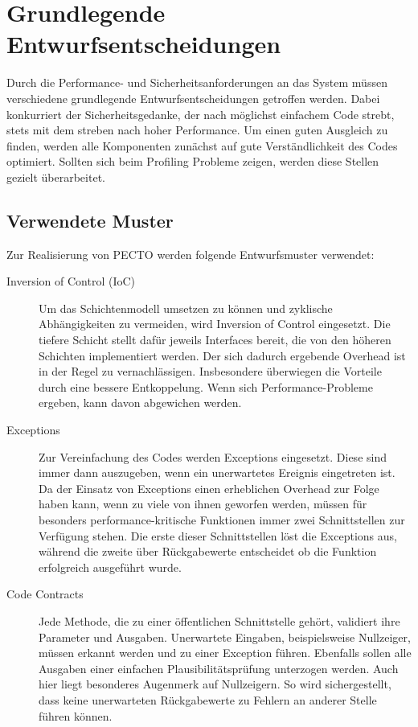 \documentclass[a4paper, 11pt, ngerman, fleqn]{article}
\begin{document}
\clearpage
\section{Grundlegende Entwurfsentscheidungen}

Durch die Performance- und Sicherheitsanforderungen an das System müssen verschiedene grundlegende Entwurfsentscheidungen getroffen werden.
Dabei konkurriert der Sicherheitsgedanke, der nach möglichst einfachem Code strebt, stets mit dem streben nach hoher Performance.
Um einen guten Ausgleich zu finden, werden alle Komponenten zunächst auf gute Verständlichkeit des Codes optimiert.
Sollten sich beim Profiling Probleme zeigen, werden diese Stellen gezielt überarbeitet.

\subsection{Verwendete Muster}
Zur Realisierung von PECTO werden folgende Entwurfsmuster verwendet:

\begin{description}
	\item[Inversion of Control (IoC)] 
	Um das Schichtenmodell umsetzen zu können und zyklische Abhängigkeiten zu vermeiden, wird Inversion of Control eingesetzt. 
	Die tiefere Schicht stellt dafür jeweils Interfaces bereit, die von den höheren Schichten implementiert werden. 
	Der sich dadurch ergebende Overhead ist in der Regel zu vernachlässigen.
	Insbesondere überwiegen die Vorteile durch eine bessere Entkoppelung.
	Wenn sich Performance-Probleme ergeben, kann davon abgewichen werden.
	
	\item[Exceptions]
	Zur Vereinfachung des Codes werden Exceptions eingesetzt.
	Diese sind immer dann auszugeben, wenn ein unerwartetes Ereignis eingetreten ist.
	Da der Einsatz von Exceptions einen erheblichen Overhead zur Folge haben kann, wenn zu viele von ihnen geworfen werden, müssen für besonders performance-kritische Funktionen immer zwei Schnittstellen zur Verfügung stehen.
	Die erste dieser Schnittstellen löst die Exceptions aus, während die zweite über Rückgabewerte entscheidet ob die Funktion erfolgreich ausgeführt wurde.
	
	\item[Code Contracts]
	Jede Methode, die zu einer öffentlichen Schnittstelle gehört, validiert ihre Parameter und Ausgaben. %
	Unerwartete Eingaben, beispielsweise Nullzeiger, müssen erkannt werden und zu einer Exception führen.
	Ebenfalls sollen alle Ausgaben einer einfachen Plausibilitätsprüfung unterzogen werden. 
	Auch hier liegt besonderes Augenmerk auf Nullzeigern.
	So wird sichergestellt, dass keine unerwarteten Rückgabewerte zu Fehlern an anderer Stelle führen können.
	
\end{description}
\end{document}

